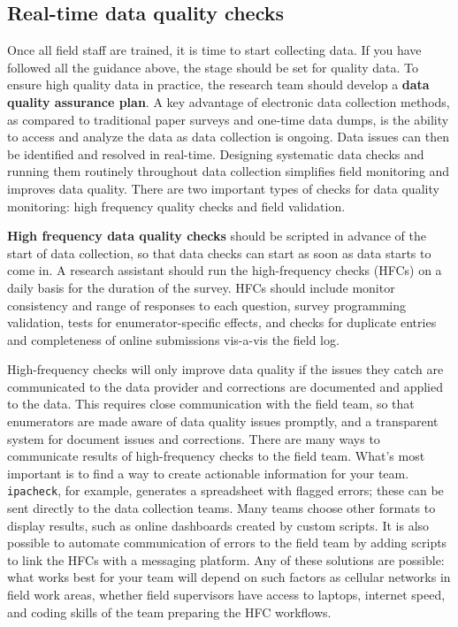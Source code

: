 \subsection{Real-time data quality checks}
Once all field staff are trained, it is time to start collecting data.
If you have followed all the guidance above, the stage should be set for quality data.
To ensure high quality data in practice, 
the research team should develop a \textbf{data quality assurance plan}.
A key advantage of electronic data collection methods,
as compared to traditional paper surveys and one-time data dumps,
is the ability to access and analyze the data as data collection is ongoing.
Data issues can then be identified and resolved in real-time.
Designing systematic data checks and running them routinely throughout data collection
simplifies field monitoring and improves data quality.
There are two important types of checks for data quality monitoring: 
high frequency quality checks and field validation.

\textbf{High frequency data quality checks} should be scripted 
in advance of the start of data collection,
so that data checks can start as soon as data starts to come in. 
A research assistant should run the high-frequency checks (HFCs) on a daily basis 
for the duration of the survey.
HFCs should include monitor consistency and range of responses to each question, 
survey programming validation, tests for enumerator-specific effects, 
and checks for duplicate entries and completeness of online submissions vis-a-vis the field log.

High-frequency checks will only improve data quality
if the issues they catch are communicated to the data provider
and corrections are documented and applied to the data.
This requires close communication with the field team, 
so that enumerators are made aware of data quality issues promptly,
and a transparent system for document issues and corrections. 
There are many ways to communicate results of high-frequency checks to the field team.
What's most important is to find a way to create actionable information for your team.
\texttt{ipacheck}, for example, generates a spreadsheet with flagged errors;
these can be sent directly to the data collection teams.
Many teams choose other formats to display results,
such as online dashboards created by custom scripts.
It is also possible to automate communication of errors to the field team
by adding scripts to link the HFCs with a messaging platform.
Any of these solutions are possible:
what works best for your team will depend on such factors as
cellular networks in field work areas, whether field supervisors have access to laptops,
internet speed, and coding skills of the team preparing the HFC workflows.

